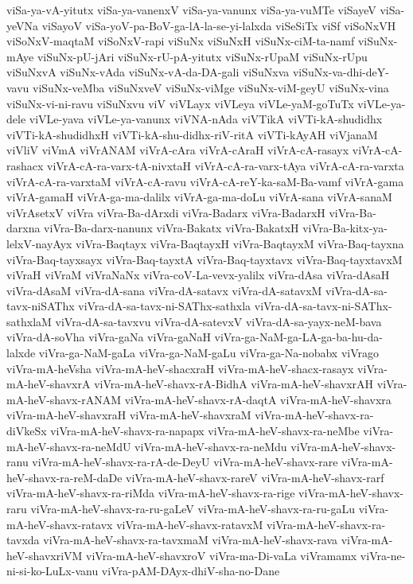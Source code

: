 {viSa-ya-vA-yitutx
viSa-ya-vanenxV
viSa-ya-vanunx
viSa-ya-vuMTe
viSayeV
viSa-yeVNa
viSayoV
viSa-yoV-pa-BoV-ga-lA-la-se-yi-lalxda
viSeSiTx
viSf
viSoNxVH
viSoNxV-maqtaM
viSoNxV-rapi
viSuNx
viSuNxH
viSuNx-ciM-ta-namf
viSuNx-mAye
viSuNx-pU-jAri
viSuNx-rU-pA-yitutx
viSuNx-rUpaM
viSuNx-rUpu
viSuNxvA
viSuNx-vAda
viSuNx-vA-da-DA-gali
viSuNxva
viSuNx-va-dhi-deY-vavu
viSuNx-veMba
viSuNxveV
viSuNx-viMge
viSuNx-viM-geyU
viSuNx-vina
viSuNx-vi-ni-ravu
viSuNxvu
viV
viVLayx
viVLeya
viVLe-yaM-goTuTx
viVLe-ya-dele
viVLe-yava
viVLe-ya-vanunx
viVNA-nAda
viVTikA
viVTi-kA-shudidhx
viVTi-kA-shudidhxH
viVTi-kA-shu-didhx-riV-ritA
viVTi-kAyAH
viVjanaM
viVliV
viVmA
viVrANAM
viVrA-cAra
viVrA-cAraH
viVrA-cA-rasayx
viVrA-cA-rashacx
viVrA-cA-ra-varx-tA-nivxtaH
viVrA-cA-ra-varx-tAya
viVrA-cA-ra-varxta
viVrA-cA-ra-varxtaM
viVrA-cA-ravu
viVrA-cA-reY-ka-saM-Ba-vamf
viVrA-gama
viVrA-gamaH
viVrA-ga-ma-dalilx
viVrA-ga-ma-doLu
viVrA-sana
viVrA-sanaM
viVrAsetxV
viVra
viVra-Ba-dArxdi
viVra-Badarx
viVra-BadarxH
viVra-Ba-darxna
viVra-Ba-darx-nanunx
viVra-Bakatx
viVra-BakatxH
viVra-Ba-kitx-ya-lelxV-nayAyx
viVra-Baqtayx
viVra-BaqtayxH
viVra-BaqtayxM
viVra-Baq-tayxna
viVra-Baq-tayxsayx
viVra-Baq-tayxtA
viVra-Baq-tayxtavx
viVra-Baq-tayxtavxM
viVraH
viVraM
viVraNaNx
viVra-coV-La-vevx-yalilx
viVra-dAsa
viVra-dAsaH
viVra-dAsaM
viVra-dA-sana
viVra-dA-satavx
viVra-dA-satavxM
viVra-dA-sa-tavx-niSAThx
viVra-dA-sa-tavx-ni-SAThx-sathxla
viVra-dA-sa-tavx-ni-SAThx-sathxlaM
viVra-dA-sa-tavxvu
viVra-dA-satevxV
viVra-dA-sa-yayx-neM-bava
viVra-dA-soVha
viVra-gaNa
viVra-gaNaH
viVra-ga-NaM-ga-LA-ga-ba-hu-da-lalxde
viVra-ga-NaM-gaLa
viVra-ga-NaM-gaLu
viVra-ga-Na-nobabx
viVrago
viVra-mA-heVsha
viVra-mA-heV-shacxraH
viVra-mA-heV-shacx-rasayx
viVra-mA-heV-shavxrA
viVra-mA-heV-shavx-rA-BidhA
viVra-mA-heV-shavxrAH
viVra-mA-heV-shavx-rANAM
viVra-mA-heV-shavx-rA-daqtA
viVra-mA-heV-shavxra
viVra-mA-heV-shavxraH
viVra-mA-heV-shavxraM
viVra-mA-heV-shavx-ra-diVkeSx
viVra-mA-heV-shavx-ra-napapx
viVra-mA-heV-shavx-ra-neMbe
viVra-mA-heV-shavx-ra-neMdU
viVra-mA-heV-shavx-ra-neMdu
viVra-mA-heV-shavx-ranu
viVra-mA-heV-shavx-ra-rA-de-DeyU
viVra-mA-heV-shavx-rare
viVra-mA-heV-shavx-ra-reM-daDe
viVra-mA-heV-shavx-rareV
viVra-mA-heV-shavx-rarf
viVra-mA-heV-shavx-ra-riMda
viVra-mA-heV-shavx-ra-rige
viVra-mA-heV-shavx-raru
viVra-mA-heV-shavx-ra-ru-gaLeV
viVra-mA-heV-shavx-ra-ru-gaLu
viVra-mA-heV-shavx-ratavx
viVra-mA-heV-shavx-ratavxM
viVra-mA-heV-shavx-ra-tavxda
viVra-mA-heV-shavx-ra-tavxmaM
viVra-mA-heV-shavx-rava
viVra-mA-heV-shavxriVM
viVra-mA-heV-shavxroV
viVra-ma-Di-vaLa
viVramamx
viVra-ne-ni-si-ko-LuLx-vanu
viVra-pAM-DAyx-dhiV-sha-no-Dane
}
